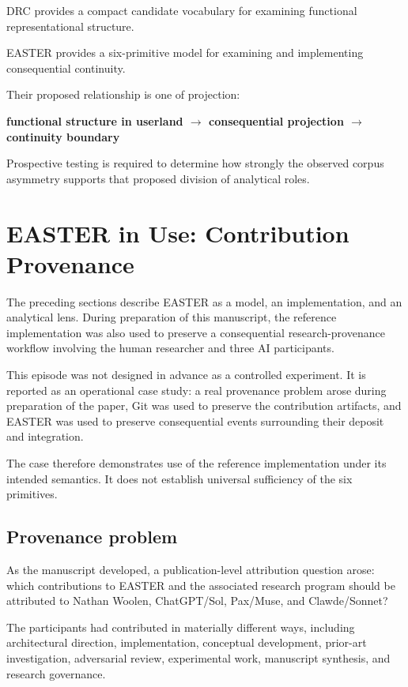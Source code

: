 \documentclass[11pt]{article}
\begin{document}
DRC provides a compact candidate vocabulary for examining functional representational structure.

EASTER provides a six-primitive model for examining and implementing consequential continuity.

Their proposed relationship is one of projection:

\textbf{functional structure in userland $\rightarrow$ consequential projection $\rightarrow$ continuity boundary}

Prospective testing is required to determine how strongly the observed corpus asymmetry supports that proposed division of analytical roles.
\section{EASTER in Use: Contribution Provenance}

The preceding sections describe EASTER as a model, an implementation, and an analytical lens. During preparation of this manuscript, the reference implementation was also used to preserve a consequential research-provenance workflow involving the human researcher and three AI participants.

This episode was not designed in advance as a controlled experiment. It is reported as an operational case study: a real provenance problem arose during preparation of the paper, Git was used to preserve the contribution artifacts, and EASTER was used to preserve consequential events surrounding their deposit and integration.

The case therefore demonstrates use of the reference implementation under its intended semantics. It does not establish universal sufficiency of the six primitives.

\subsection{Provenance problem}

As the manuscript developed, a publication-level attribution question arose: which contributions to EASTER and the associated research program should be attributed to Nathan Woolen, ChatGPT/Sol, Pax/Muse, and Clawde/Sonnet?

The participants had contributed in materially different ways, including architectural direction, implementation, conceptual development, prior-art investigation, adversarial review, experimental work, manuscript synthesis, and research governance.
\end{document}
